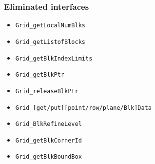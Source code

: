 \documentclass{article}
\newcommand{\code}[1]{{\tt#1}}
\begin{document}
\subsubsection*{Eliminated interfaces}
\begin{itemize}
\item \code{Grid\_getLocalNumBlks}
\item \code{Grid\_getListofBlocks}
\item \code{Grid\_getBlkIndexLimits}
\item \code{Grid\_getBlkPtr}
\item \code{Grid\_releaseBlkPtr}
\item \code{Grid\_[get/put][point/row/plane/Blk]Data}
\item \code{Grid\_BlkRefineLevel}
\item \code{Grid\_getBlkCornerId}
\item \code{Grid\_getBlkBoundBox}
\end{itemize}
\end{document}
